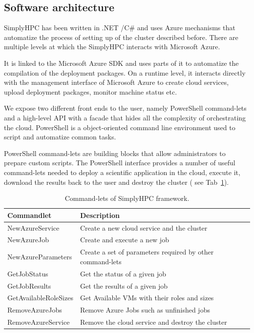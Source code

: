\documentclass[3p,times]{elsarticle}
\begin{document}
\subsection{Software architecture}

SimplyHPC has been written in .NET  /C\# and uses Azure mechanisms that automatize the process of setting up of the cluster described before. There are multiple levels at which the SimplyHPC interacts with Microsoft Azure.

It is linked to the Microsoft Azure SDK and uses parts of it to automatize the compilation of the deployment packages. On a runtime level, it interacts directly with the management interface of Microsoft Azure to create cloud services, upload deployment packages, monitor machine status etc.


We expose two different front ends to the user, namely PowerShell command-lets and a high-level API with a facade that hides all the complexity of orchestrating the cloud.  PowerShell is a object-oriented command line environment used to script and automatize common tasks.

PowerShell command-lets are building blocks that allow administrators to prepare custom scripts. The PowerShell interface provides a number of useful command-lets needed to deploy a scientific application in the cloud, execute it, download the results back to the user and destroy the cluster ( see Tab~\ref{tab:CommandletsOfSimplyHPC}). 

\begin{table}
	\centering		
		\begin{tabular}{|l|l|}
		\hline
      \textbf{Commandlet} & \textbf{Description} \\ \hline
      NewAzureService & Create a new cloud service and the cluster \\ \hline
			NewAzureJob & Create and execute a new job \\ \hline
			NewAzureParameters & Create a set of parameters required by other command-lets    \\ \hline
			GetJobStatus & Get the status of a given job    \\ \hline
			GetJobResults & Get the results of a given job  \\ \hline
			GetAvailableRoleSizes & Get Available VMs with their roles and sizes \\ \hline
			RemoveAzureJobs & Remove Azure Jobs such as unfinished jobs \\ \hline
			RemoveAzureService & Remove the cloud service and destroy the cluster \\ \hline
    \end{tabular}
	\caption{Command-lets of SimplyHPC framework.}
	\label{tab:CommandletsOfSimplyHPC}
\end{table}
\end{document}
